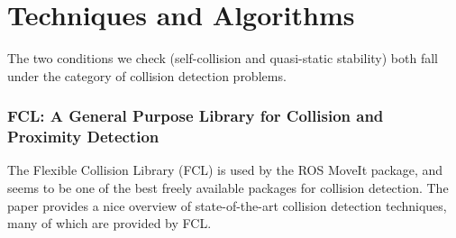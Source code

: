\documentclass[12pt]{article}
\begin{document}
\section*{Techniques and Algorithms}
The two conditions we check (self-collision and quasi-static stability)
both fall under the category of collision detection problems.

\subsubsection*{FCL: A General Purpose Library for Collision and Proximity Detection
\cite{pan2012fcl}}
The Flexible Collision Library (FCL) is used by the ROS MoveIt package, and seems
to be one of the best freely available packages for collision detection. The paper
provides a nice overview of state-of-the-art collision detection techniques, many
of which are provided by FCL.
 


\end{document}
